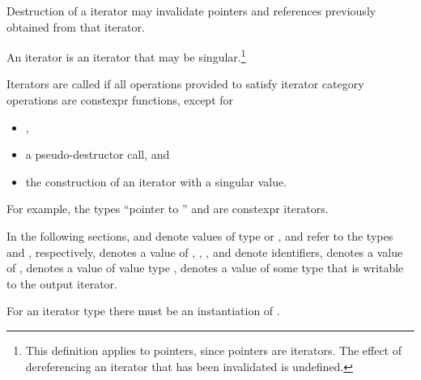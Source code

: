 \pnum
Destruction of a  iterator 
may invalidate pointers and references previously obtained from that iterator.

\pnum
An
iterator is an iterator that may be singular.\footnote{This definition applies
to pointers, since pointers are iterators. The effect of dereferencing
an iterator that has been invalidated is undefined.}

\pnum
{}%
Iterators are called 
if all operations provided to satisfy iterator category operations
are constexpr functions, except for
\begin{itemize}
\item {},
\item a pseudo-destructor call, and
\item the construction of an iterator with a singular value.
\end{itemize}
\begin{note}
For example, the types ``pointer to '' and
 are constexpr iterators.
\end{note}

\begin{removedblock}
\pnum
In the following sections,
and
denote values of type
 or ,
 and  refer to the
types  and
, respectively,
denotes a value of
,
,
,
and
denote identifiers,
denotes a value of
,
denotes a value of value type
,
denotes a value of some type that is writable to the output iterator.
\begin{note} For an iterator type  there must be an instantiation
of . \end{note}
\end{removedblock}

